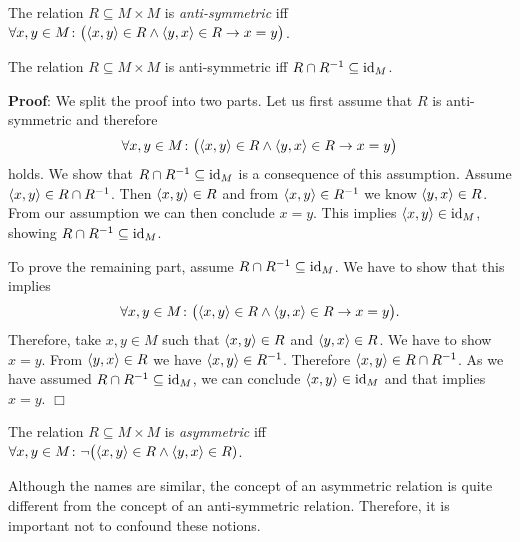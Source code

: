 \begin{Definition}
The relation $R \subseteq M \times M$  is \emph{anti-symmetric} iff \\[0.2cm]
\hspace*{1.3cm} 
$\forall x, y \in M \colon \bigl(\pair(x,y) \in R \wedge \pair(y,x) \in R \rightarrow x = y\bigr)$.
\end{Definition}

\begin{Proposition}
The relation $R \subseteq M \times M$  is anti-symmetric iff
$R \cap R^{-1} \subseteq \mbox{\rm id}_{M}$.
\end{Proposition}

\noindent
\textbf{Proof}:
We split the proof into two parts.  Let us first assume that $R$ is anti-symmetric and therefore
\[ \forall x, y \in M \colon \bigl(\pair(x,y) \in R \wedge \pair(y,x) \in R \rightarrow x = y\bigr) \]
holds.  We show that $R \cap R^{-1} \subseteq \textrm{id}_{M}$ is a consequence of this
assumption.  Assume $\pair(x,y) \in R \cap R^{-1}$.
Then $\pair(x,y) \in R$ and from $\pair(x,y) \in R^{-1}$ we know  $\pair(y,x) \in R$.
From our assumption we can then conclude  $x=y$.
This implies $\pair(x,y) \in \id_M$, showing  $R \cap R^{-1} \subseteq \textrm{id}_{M}$.

To prove the remaining part, assume $R \cap R^{-1} \subseteq \textrm{id}_{M}$.  We have to show
that this implies 
\[ \forall x, y \in M \colon \bigl(\pair(x,y) \in R \wedge \pair(y,x) \in R \rightarrow x = y\bigr). \]
Therefore, take $x,y \in M$ such that $\pair(x,y) \in R$ and $\pair(y,x) \in R$.  We have
to show  $x=y$.  From $\pair(y,x) \in R$ we have
$\pair(x,y) \in R^{-1}$.  Therefore $\pair(x,y) \in R \cap R^{-1}$.
As we have assumed $R \cap R^{-1} \subseteq \textrm{id}_{M}$, we can conclude
$\pair(x,y) \in \id_M$ and that implies $x = y$. \hspace*{\fill} $\Box$
\vspace*{0.2cm}

\begin{Definition}
The relation $R \subseteq M \times M$  is \emph{asymmetric} iff \\[0.2cm]
\hspace*{1.3cm} 
$\forall x, y \in M \colon \neg \bigl(\pair(x,y) \in R \wedge \pair(y,x) \in R)$.
\end{Definition}

Although the names are similar, the concept of  an asymmetric relation is quite different
from the concept  of an anti-symmetric relation.
Therefore, it is important not to confound these notions.

